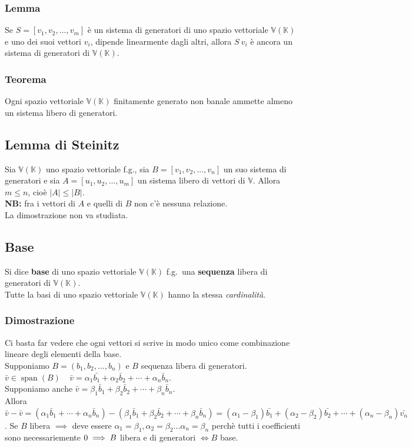 \documentclass{article}
\DeclareMathOperator{\Span}{span}
\newcommand{\V}{\mathbb{V} (\mathbb{K})}
\newcommand{\s}[2]{#1_1, #1_2, \ldots, #1_{#2}}
\begin{document}
\subsubsection{Lemma}
Se $S = [\s{v}{m}]$ è un sistema di generatori di uno spazio vettoriale $\V$ e
uno dei suoi vettori $v_i$, dipende linearmente dagli altri, allora $S \ {v_i}$
è ancora un sistema di generatori di $\V$.

\subsubsection{Teorema}
Ogni spazio vettoriale $\V$ finitamente generato non banale ammette almeno un
sistema libero di generatori.

\subsection{Lemma di Steinitz}
Sia $\V$ uno spazio vettoriale f.g., sia $B=[\s{v}{n}]$ un suo sistema di
generatori e sia $A=[\s{u}{m}]$ un sistema libero di vettori di $\mathbb V$.
Allora $m\leq n$, cioè $|A|\leq|B|$.\\ \textbf{NB:} fra i vettori di $A$ e
quelli di $B$ non c'è nessuna relazione.\\ La dimostrazione non va studiata.

\subsection{Base}
Si dice \textbf{base} di uno spazio vettoriale $\V$ f.g.\ una \textbf{sequenza}
libera di generatori di $\V$. \\ Tutte la basi di uno spazio vettoriale $\V$
hanno la stessa \textit{cardinalità}.

\subsubsection{Dimostrazione}
Ci basta far vedere che ogni vettori si scrive in modo unico come combinazione
lineare degli elementi della base.\\ Supponiamo $B=(\s{b}{n})$ e $B$ sequenza
libera di generatori.\\ $\bar v \in \Span(B) \ \ \ \ \ \bar v =
    \alpha_1\bar{b_1}+\alpha_2\bar b_2 + \cdots +\alpha_n\bar b_n$.\\ Supponiamo
anche $\bar v = \beta_1\bar b_1+\beta_2\bar b_2 + \cdots +\beta_n\bar b_n$.\\
Allora $\bar{v}-\bar v = (\alpha_1\bar b_1+\cdots+\alpha_n\bar b_n) -
    (\beta_1\bar b_1+\beta_2\bar b_2 + \cdots +\beta_n\bar b_n) =
    (\alpha_1-\beta_1)\bar{b_1}+(\alpha_2-\beta_2)\bar{b_2}+\cdots+(\alpha_n-\beta_n)\bar{v_n}$.
Se $B$ libera $\implies$ deve essere $\alpha_1 = \beta_1, \alpha_2 = \beta_2
    \ldots \alpha_n = \beta_n$ perchè tutti i coefficienti sono necessariemente
$0\\ \implies B$ libera e di generatori $\iff B$ base.
\end{document}
